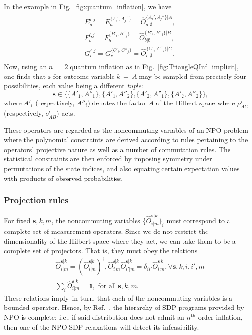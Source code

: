 \documentclass[superscriptaddress,aps,prx,nofootinbib,twocolumn,twoside,reprint,letterpaper,longbibliography]{revtex4-2}
\def\id{\boldsymbol{\mathbb{1}}}
\begin{document}
In the example in Fig.~\ref{fig:quantum_inflation}, we have
\begin{align}
  \begin{split}\label{eq:notationtranslation}
  &E_a^{i,j} = E^{\{A_i',A_j''\}}_{a} = \hat{O}^{\{A_i',A_j''\}|A}_{a|\emptyset} ,
  \\ &F_b^{i,j} = F^{\{B'_i, B''_j\}}_{b} = \hat{O}^{\{B'_i, B''_j\}|B}_{b|\emptyset} ,
  \\ &G_c^{i,j} = G^{\{C'_i,C''_j\}}_{c} = \hat{O}^{\{C'_i,C''_j\}|C}_{c|\emptyset} .
  \end{split}\end{align}
Now, using an $n\,{=}\,2$ quantum inflation as in Fig.~\ref{fig:TriangleQInf_implicit}, one finds that $\boldsymbol{s}$ for outcome variable $k\,{=}\,A$ may be sampled from precisely four possibilities, each value being a different \emph{tuple}:
\begin{equation*}
  \quad\boldsymbol{s}\in\bigg\{
  \{A'_{1},A''_{1}\},\{A'_{1},A''_{2}\},\{A'_{2},A''_{1}\},\{A'_{2},A''_{2}\}
  \bigg\},
\end{equation*}
\noindent where $A'_i$ (respectively, $A''_i$) denotes the factor $A$ of the Hilbert space where $\rho^i_{AC}$ (respectively, $\rho^i_{AB}$) acts.

These operators are regarded as the noncommuting variables of an NPO problem where the polynomial constraints are derived according to rules pertaining to the operators' projective nature as well as a number of commutation rules. The statistical constraints are then enforced by imposing symmetry under permutations of the state indices, and also equating certain expectation values with products of observed probabilities.

\subsubsection*{Projection rules}
For fixed $\boldsymbol{s},k,m$, the noncommuting variables $\{\hat{O}^{\boldsymbol{s}|k}_{i|m}\}_i$ must correspond to a complete set of measurement operators. Since we do not restrict the dimensionality of the Hilbert space where they act, we can take them to be a complete set of projectors. That is, they must obey the relations
%
\begin{subequations}\begin{align}
\label{rule1}
&\hat{O}^{\boldsymbol{s}|k}_{i|m}=(\hat{O}^{\boldsymbol{s}|k}_{i|m})^\dagger,\hat{O}^{\boldsymbol{s}|k}_{i|m}\hat{O}^{\boldsymbol{s}|k}_{i'|m}=\delta_{ii'}\hat{O}^{\boldsymbol{s}|k}_{i|m},\forall\boldsymbol{s},k,i,i',m \\
\label{rule2}
&\sum\nolimits_{i}\hat{O}^{\boldsymbol{s}|k}_{i|m}=\id, \mbox{ for all }\boldsymbol{s},k,m.
\end{align}
\label{rules}
\end{subequations}
%
These relations imply, in turn, that each of the noncommuting variables is a bounded operator. Hence, by Ref.~\cite{npo}, the hierarchy of SDP programs provided by NPO is complete; i.e., if said distribution does not admit an $n^\text{th}$-order inflation, then one of the NPO SDP relaxations will detect its infeasibility.
\end{document}
